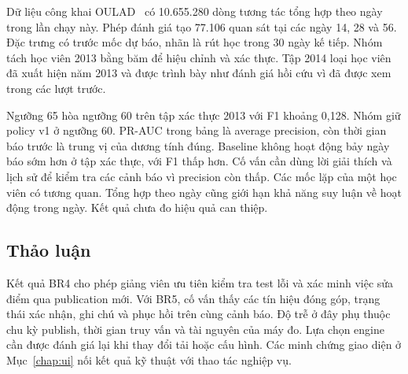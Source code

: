 Dữ liệu công khai OULAD~\cite{kuzilek2017oulad,ucioulad} có 10.655.280 dòng tương tác tổng hợp theo ngày trong lần chạy này. Phép đánh giá tạo 77.106 quan sát tại các ngày 14, 28 và 56. Đặc trưng có trước mốc dự báo, nhãn là rút học trong 30 ngày kế tiếp. Nhóm tách học viên 2013 bằng băm để hiệu chỉnh và xác thực. Tập 2014 loại học viên đã xuất hiện năm 2013 và được trình bày như đánh giá hồi cứu vì đã được xem trong các lượt trước.



Ngưỡng 65 hòa ngưỡng 60 trên tập xác thực 2013 với F1 khoảng 0{,}128. Nhóm giữ policy v1 ở ngưỡng 60. PR-AUC trong bảng là average precision, còn thời gian báo trước là trung vị của dương tính đúng. Baseline không hoạt động bảy ngày báo sớm hơn ở tập xác thực, với F1 thấp hơn. Cố vấn cần dùng lời giải thích và lịch sử để kiểm tra các cảnh báo vì precision còn thấp. Các mốc lặp của một học viên có tương quan. Tổng hợp theo ngày cũng giới hạn khả năng suy luận về hoạt động trong ngày. Kết quả chưa đo hiệu quả can thiệp.

\subsection{Thảo luận}

Kết quả BR4 cho phép giảng viên ưu tiên kiểm tra test lỗi và xác minh việc sửa điểm qua publication mới. Với BR5, cố vấn thấy các tín hiệu đóng góp, trạng thái xác nhận, ghi chú và phục hồi trên cùng cảnh báo. Độ trễ ở đây phụ thuộc chu kỳ publish, thời gian truy vấn và tài nguyên của máy đo. Lựa chọn engine cần được đánh giá lại khi thay đổi tải hoặc cấu hình. Các minh chứng giao diện ở Mục~\ref{chap:ui} nối kết quả kỹ thuật với thao tác nghiệp vụ.
